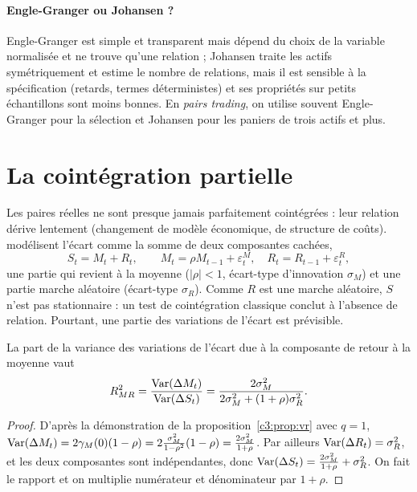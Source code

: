\paragraph{Engle-Granger ou Johansen ?} Engle-Granger est simple et transparent mais dépend du choix de la variable normalisée et ne trouve qu'une relation ; Johansen traite les actifs symétriquement et estime le nombre de relations, mais il est sensible à la spécification (retards, termes déterministes) et ses propriétés sur petits échantillons sont moins bonnes. En \emph{pairs trading}, on utilise souvent Engle-Granger pour la sélection et Johansen pour les paniers de trois actifs et plus.

\section{La cointégration partielle}

Les paires réelles ne sont presque jamais parfaitement cointégrées : leur relation dérive lentement (changement de modèle économique, de structure de coûts). \citet{clegg2018} modélisent l'écart comme la somme de deux composantes cachées,
\[
S_t = M_t + R_t, \qquad M_t = \rho M_{t-1} + \varepsilon^M_t,\quad R_t = R_{t-1} + \varepsilon^R_t,
\]
une partie qui revient à la moyenne ($|\rho|<1$, écart-type d'innovation $\sigma_M$) et une partie marche aléatoire (écart-type $\sigma_R$). Comme $R$ est une marche aléatoire, $S$ n'est pas stationnaire : un test de cointégration classique conclut à l'absence de relation. Pourtant, une partie des variations de l'écart est prévisible.

\begin{proposition}\label{c4:prop:r2mr}
La part de la variance des variations de l'écart due à la composante de retour à la moyenne vaut
\[
R^2_{MR} = \frac{\operatorname{Var}(\Delta M_t)}{\operatorname{Var}(\Delta S_t)} = \frac{2\sigma_M^2}{2\sigma_M^2 + (1+\rho)\sigma_R^2}.
\]
\end{proposition}
\begin{proof}
D'après la démonstration de la proposition~\ref{c3:prop:vr} avec $q=1$, $\operatorname{Var}(\Delta M_t) = 2\gamma_M(0)(1-\rho) = 2\frac{\sigma_M^2}{1-\rho^2}(1-\rho) = \frac{2\sigma_M^2}{1+\rho}$. Par ailleurs $\operatorname{Var}(\Delta R_t) = \sigma_R^2$, et les deux composantes sont indépendantes, donc $\operatorname{Var}(\Delta S_t) = \frac{2\sigma_M^2}{1+\rho} + \sigma_R^2$. On fait le rapport et on multiplie numérateur et dénominateur par $1+\rho$.
\end{proof}

